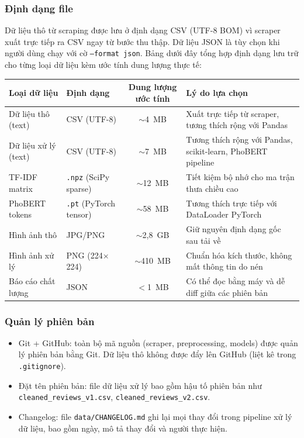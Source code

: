 \subsubsection{Định dạng file}

Dữ liệu thô từ scraping được lưu ở định dạng CSV (UTF-8 BOM) vì scraper xuất trực tiếp ra CSV ngay từ bước thu thập. Dữ liệu JSON là tùy chọn khi người dùng chạy với cờ \texttt{--format json}. Bảng dưới đây tổng hợp định dạng lưu trữ cho từng loại dữ liệu kèm ước tính dung lượng thực tế:

\begin{center}
\renewcommand{\arraystretch}{1.4}
\begin{tabularx}{\textwidth}{|l|l|c|X|}
\hline
\rowcolor[HTML]{E8E8E8}
\textbf{Loại dữ liệu} & \textbf{Định dạng} & \textbf{Dung lượng ước tính} & \textbf{Lý do lựa chọn} \\
\hline
Dữ liệu thô (text) & CSV (UTF-8) & $\sim$4~MB & Xuất trực tiếp từ scraper, tương thích rộng với Pandas \\
\hline
Dữ liệu xử lý (text) & CSV (UTF-8) & $\sim$7~MB & Tương thích rộng với Pandas, scikit-learn, PhoBERT pipeline \\
\hline
TF-IDF matrix & \texttt{.npz} (SciPy sparse) & $\sim$12~MB & Tiết kiệm bộ nhớ cho ma trận thưa chiều cao \\
\hline
PhoBERT tokens & \texttt{.pt} (PyTorch tensor) & $\sim$58~MB & Tương thích trực tiếp với DataLoader PyTorch \\
\hline
Hình ảnh thô & JPG/PNG & $\sim$2,8~GB & Giữ nguyên định dạng gốc sau tải về \\
\hline
Hình ảnh xử lý & PNG (224$\times$224) & $\sim$410~MB & Chuẩn hóa kích thước, không mất thông tin do nén \\
\hline
Báo cáo chất lượng & JSON & $<$1~MB & Có thể đọc bằng máy và dễ diff giữa các phiên bản \\
\hline
\end{tabularx}
\end{center}

\subsubsection{Quản lý phiên bản}

\begin{itemize}[labelsep=10pt, leftmargin=2cm]
    \item Git + GitHub: toàn bộ mã nguồn (scraper, preprocessing, models) được quản lý phiên bản bằng Git. Dữ liệu thô không được đẩy lên GitHub (liệt kê trong \texttt{.gitignore}).
    \item Đặt tên phiên bản: file dữ liệu xử lý bao gồm hậu tố phiên bản như \texttt{cleaned\_reviews\_v1.csv}, \texttt{cleaned\_reviews\_v2.csv}.
    \item Changelog: file \texttt{data/CHANGELOG.md} ghi lại mọi thay đổi trong pipeline xử lý dữ liệu, bao gồm ngày, mô tả thay đổi và người thực hiện.
\end{itemize}

